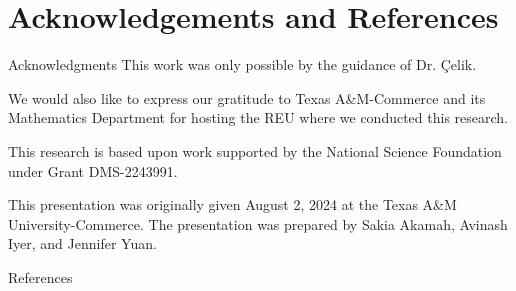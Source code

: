 \documentclass{reu_beamer}
\begin{document}
\section{Acknowledgements and References}
    \begin{frame}{Acknowledgments}
    \centering
    This work was only possible by the guidance of Dr. \c{C}elik.\newline
    
    We would also like to express our gratitude to Texas A\&M-Commerce and its Mathematics Department for hosting the REU where we conducted this research.\newline
    
    This research is based upon work supported by the National Science Foundation under Grant DMS-2243991.\newline
    
    This presentation was originally given August 2, 2024 at the Texas A\&M University-Commerce. The presentation was prepared by Sakia Akamah, Avinash Iyer, and Jennifer Yuan.
\end{frame}
%
\begin{frame}[allowframebreaks]{References}
\nocite{*}

{\small}
\end{frame}

\end{document}
